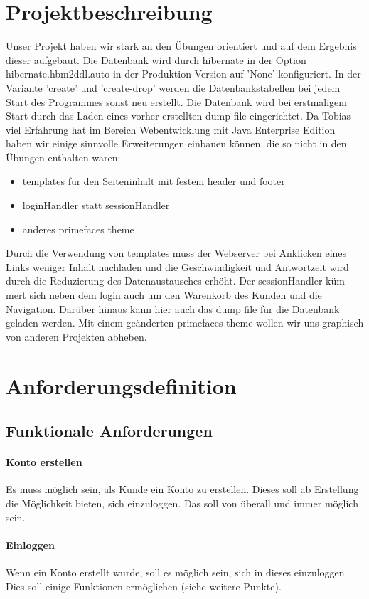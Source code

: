\documentclass[a4paper]{article}
\begin{document}

\tableofcontents
\thispagestyle{empty}
\newpage


\section{Projektbeschreibung}
Unser Projekt haben wir stark an den Übungen orientiert und auf dem Ergebnis dieser aufgebaut. 
Die Datenbank wird durch hibernate in der Option hibernate.hbm2ddl.auto in der Produktion Version auf 'None' konfiguriert. In der Variante 'create' und 'create-drop' werden die Datenbankstabellen bei jedem Start des Programmes sonst neu erstellt.
Die Datenbank wird bei erstmaligem Start durch das Laden eines vorher erstellten dump file eingerichtet.
Da Tobias viel Erfahrung hat im Bereich Webentwicklung mit Java Enterprise Edition haben wir einige sinnvolle Erweiterungen einbauen können, die so nicht in den Übungen enthalten waren:
\begin{itemize}
	\item templates für den Seiteninhalt mit festem header und footer 
	\item loginHandler statt sessionHandler
	\item anderes primefaces theme
\end{itemize}
Durch die Verwendung von templates muss der Webserver bei Anklicken eines Links weniger Inhalt nachladen und die Geschwindigkeit und Antwortzeit wird durch die Reduzierung des Datenaustausches erhöht.
Der sessionHandler küm-mert sich neben dem login auch um den Warenkorb des Kunden und die Navigation. Darüber hinaus kann hier auch das dump file für die Datenbank geladen werden.
Mit einem geänderten primefaces theme wollen wir uns graphisch von anderen Projekten abheben.


\section{Anforderungsdefinition}
\subsection{Funktionale Anforderungen}
\paragraph{Konto erstellen}
Es muss möglich sein, als Kunde ein Konto zu erstellen. Dieses soll ab Erstellung die Möglichkeit bieten, sich einzuloggen. Das soll von überall und immer möglich sein.
\paragraph{Einloggen}
Wenn ein Konto erstellt wurde, soll es möglich sein, sich in dieses einzuloggen. Dies soll einige Funktionen ermöglichen (siehe weitere Punkte).
\end{document}
